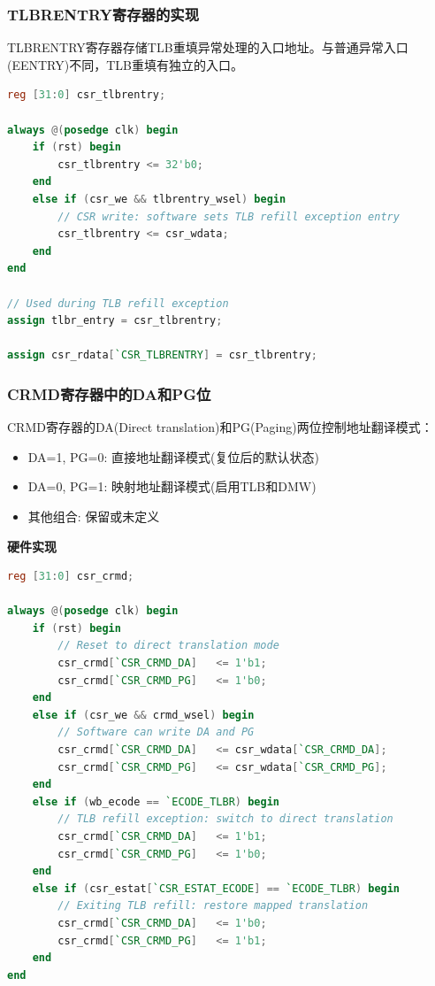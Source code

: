 
\subsubsection{TLBRENTRY寄存器的实现}

TLBRENTRY寄存器存储TLB重填异常处理的入口地址。与普通异常入口(EENTRY)不同，TLB重填有独立的入口。

\begin{lstlisting}[language=Verilog, caption=TLBRENTRY寄存器实现]
reg [31:0] csr_tlbrentry;

always @(posedge clk) begin
    if (rst) begin
        csr_tlbrentry <= 32'b0;
    end
    else if (csr_we && tlbrentry_wsel) begin
        // CSR write: software sets TLB refill exception entry
        csr_tlbrentry <= csr_wdata;
    end
end

// Used during TLB refill exception
assign tlbr_entry = csr_tlbrentry;

assign csr_rdata[`CSR_TLBRENTRY] = csr_tlbrentry;
\end{lstlisting}

\subsubsection{CRMD寄存器中的DA和PG位}

CRMD寄存器的DA(Direct translation)和PG(Paging)两位控制地址翻译模式：

\begin{itemize}
    \item DA=1, PG=0: 直接地址翻译模式(复位后的默认状态)
    \item DA=0, PG=1: 映射地址翻译模式(启用TLB和DMW)
    \item 其他组合: 保留或未定义
\end{itemize}

\noindent\textbf{硬件实现}

\begin{lstlisting}[language=Verilog, caption=CRMD的DA/PG位实现]
reg [31:0] csr_crmd;

always @(posedge clk) begin
    if (rst) begin
        // Reset to direct translation mode
        csr_crmd[`CSR_CRMD_DA]   <= 1'b1;
        csr_crmd[`CSR_CRMD_PG]   <= 1'b0;
    end
    else if (csr_we && crmd_wsel) begin
        // Software can write DA and PG
        csr_crmd[`CSR_CRMD_DA]   <= csr_wdata[`CSR_CRMD_DA];
        csr_crmd[`CSR_CRMD_PG]   <= csr_wdata[`CSR_CRMD_PG];
    end
    else if (wb_ecode == `ECODE_TLBR) begin
        // TLB refill exception: switch to direct translation
        csr_crmd[`CSR_CRMD_DA]   <= 1'b1;
        csr_crmd[`CSR_CRMD_PG]   <= 1'b0;
    end
    else if (csr_estat[`CSR_ESTAT_ECODE] == `ECODE_TLBR) begin
        // Exiting TLB refill: restore mapped translation
        csr_crmd[`CSR_CRMD_DA]   <= 1'b0;
        csr_crmd[`CSR_CRMD_PG]   <= 1'b1;
    end
end
\end{lstlisting}



